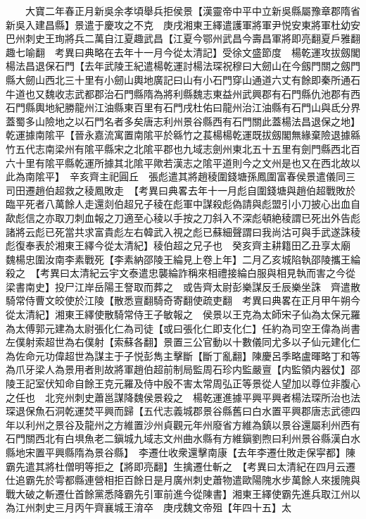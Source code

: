 　　大寶二年春正月新吳余孝頃舉兵拒侯景【漢靈帝中平中立新吳縣屬豫章郡隋省新吳入建昌縣】景遣于慶攻之不克　庚戌湘東王繹遣護軍將軍尹悦安東將軍杜幼安巴州刺史王珣將兵二萬自江夏趣武昌【江夏今鄂州武昌今壽昌軍將即亮翻夏戶雅翻趣七喻翻　考異曰典略在去年十一月今從太清記】受徐文盛節度　楊乾運攻拔劔閣楊法昌退保石門【去年武陵王紀遣楊乾運討楊法琛祝穆曰大劒山在今劔門關之劔門縣大劒山西北三十里有小劒山輿地廣記曰山有小石門穿山通道六丈有餘即秦所通石牛道也又魏收志武都郡治石門縣隋為將利縣魏志東益州武興郡有石門縣仇池郡有西石門縣輿地紀勝龍州江油縣東百里有石門戌杜佑曰龍州治江油縣有石門山與氐分界蓋蜀多山險地之以石門名者多矣唐志利州景谷縣西有石門關此蓋楊法昌退保之地】乾運據南隂平【晉永嘉流寓置南隂平於緜竹之萇楊楊乾運既拔劔閣無緣棄險退據緜竹五代志南梁州有隂平縣宋之北隂平郡也九域志劍州東北五十五里有劍門縣西北百六十里有隂平縣乾運所據其北隂平歟若漢志之隂平道則今之文州是也又在西北故以此為南隂平】　辛亥齊主祀圓丘　張彪遣其將趙稜圍錢塘孫鳳圍富春侯景遣儀同三司田遷趙伯超救之稜鳳敗走　【考異曰典畧去年十一月彪自圍錢塘與趙伯超戰敗於臨平死者八萬餘人走還剡伯超兄子稜在彪軍中謀殺彪偽請與彪盟引小刀披心出血自歃彪信之亦取刀刺血報之刀適至心稜以手按之刀斜入不深彪頓絶稜謂已死出外告彪諸將云彪已死當共求富貴彪左右韓武入視之彪已蘇細聲謂曰我尚沽可與手武遂誅稜彪復奉表於湘東王繹今從太清紀】稜伯超之兄子也　癸亥齊主耕籍田乙丑享太廟　魏楊忠圍汝南李素戰死【李素納邵陵王綸見上卷上年】二月乙亥城陷執邵陵攜王綸殺之　【考異曰太清紀云宇文泰遣忠襲綸詐稱來相禮接綸白服與相見執而害之今從梁書南史】投尸江岸岳陽王詧取而葬之　或告齊太尉彭樂謀反壬辰樂坐誅　齊遣散騎常侍曹文皎使於江陵【散悉亶翻騎奇寄翻使疏吏翻　考異曰典畧在正月甲午朔今從太清紀】湘東王繹使散騎常侍王子敏報之　侯景以王克為太師宋子仙為太保元羅為太傅郭元建為太尉張化仁為司徒【或曰張化仁即支化仁】任約為司空王偉為尚書左僕射索超世為右僕射【索蘇各翻】景置三公官動以十數儀同尤多以子仙元建化仁為佐命元功偉超世為謀主于子悦彭雋主擊斷【斷丁亂翻】陳慶呂季略盧暉略丁和等為爪牙梁人為景用者則故將軍趙伯超前制局監周石珍内監嚴亶【内監領内器仗】邵陵王記室伏知命自餘王克元羅及侍中殷不害太常周弘正等景從人望加以尊位非腹心之任也　北兖州刺史蕭邕謀降魏侯景殺之　楊乾運進據平興平興者楊法琛所治也法琛退保魚石洞乾運焚平興而歸【五代志義城郡景谷縣舊曰白水置平興郡唐志武德四年以利州之景谷及龍州之方維置沙州貞觀元年州廢省方維為鎮以景谷還屬利州西有石門關西北有白埧魚老二鎭城九域志文州曲水縣有方維鎭劉煦曰利州景谷縣漢白水縣地宋置平興縣隋為景谷縣】　李遷仕收衆還擊南康【去年李遷仕敗走保寜都】陳霸先遣其將杜僧明等拒之【將即亮翻】生擒遷仕斬之　【考異曰太清紀在四月云遷仕追霸先於雩都縣連營相拒百餘日是月廣州刺史蕭物遣歐陽隗水步萬餘人來援隗與戰大破之斬遷仕首餘黨悉降霸先引軍前進今從陳書】湘東王繹使霸先進兵取江州以為江州刺史三月丙午齊襄城王淯卒　庚戌魏文帝殂【年四十五】太

